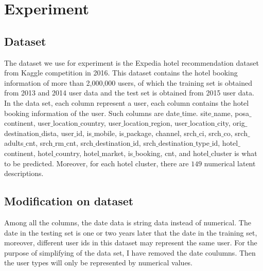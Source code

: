 \documentclass[11pt]{article} %
\begin{document}
\section{Experiment}
\subsection{Dataset}
The dataset we use for experiment is the Expedia hotel recommendation dataset from Kaggle competition in 2016. This dataset contains the hotel booking information of more than 2,000,000 users, of which the training set is obtained from 2013 and 2014 user data and the test set is obtained from 2015 user data.\\
In the data set, each column represent a user, each column contains the hotel booking information of the user. Such columns are date$\_$time. site$\_$name, posa$\_$continent, user$\_$location$\_$country, user$\_$location$\_$region, user$\_$location$\_$city, orig$\_$destination$\_$dista, user$\_$id, is$\_$mobile, is$\_$package, channel, srch$\_$ci, srch$\_$co, srch$\_$adults$\_$cnt, srch$\_$rm$\_$cnt, srch$\_$destination$\_$id, srch$\_$destination$\_$type$\_$id, hotel$\_$continent, hotel$\_$country, hotel$\_$market, is$\_$booking, cnt, and hotel$\_$cluster is what to be predicted. Moreover, for each hotel cluster, there are $149$ numerical latent descriptions.
\subsection{Modification on dataset}
Among all the columns, the date data is string data instead of numerical. The date in the testing set is one or two years later that the date in the training set, moreover, different user ids in this dataset may represent the same user. For the purpose of simplifying of the data set, I have removed the date coulumns. Then the user types will only be represented by numerical values.
\end{document}

